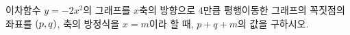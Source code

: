 이차함수 $y=-2x^2$의 그래프를 $x$축의 방향으로 $4$만큼 평행이동한 그래프의 꼭짓점의 좌표를 $(p{,}\mkern3mu\mathopen{}q)$, 축의 방정식을 $x=m$이라 할 때, $p+q+m$의 값을 구하시오.
